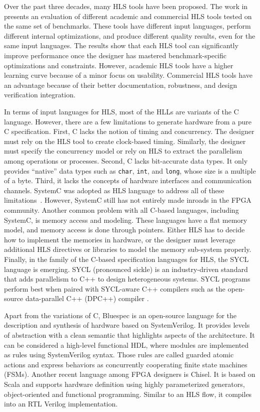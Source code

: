 Over the past three decades, many HLS tools have been proposed. The work in \cite{survey_evaluation} presents an evaluation of different academic and commercial HLS tools tested on the same set of benchmarks. These tools have different input languages, perform different internal optimizations, and produce different quality results, even for the same input languages. The results show that each HLS tool can significantly improve performance once the designer has mastered benchmark-specific optimizations and constraints. However, academic HLS tools have a higher learning curve because of a minor focus on usability. Commercial HLS tools have an advantage because of their better documentation, robustness, and design verification integration.

In terms of input languages for HLS, most of the HLLs are variants of the C language. However, there are a few limitations to generate hardware from a pure C specification. First, C lacks the notion of timing and concurrency. The designer must rely on the HLS tool to create clock-based timing. Similarly, the designer must specify the concurrency model or rely on HLS to extract the parallelism among operations or processes. Second, C lacks bit-accurate data types. It only provides ``native'' data types such as \texttt{char}, \texttt{int}, and \texttt{long}, whose size is a multiple of a byte. Third, it lacks the concepts of hardware interfaces and communication channels. SystemC was adopted as HLS language to address all of these limitations~\cite{6838614}. However, SystemC still has not entirely made inroads in the FPGA community. Another common problem with all C-based languages, including SystemC, is memory access and modeling. These languages have a flat memory model, and memory access is done through pointers. Either HLS has to decide how to implement the memories in hardware, or the designer must leverage additional HLS directives or libraries to model the memory sub-system properly. Finally, in the family of the C-based specification languages for HLS, the SYCL language is emerging. SYCL (pronounced sickle) is an industry-driven standard that adds parallelism to C++ to design heterogeneous systems. SYCL programs perform best when paired with SYCL-aware C++ compilers such as the open-source data-parallel C++ (DPC++) compiler \cite{dpcplus}.

Apart from the variations of C, Bluespec is an open-source language for the description and synthesis of hardware based on SystemVerilog. It provides levels of abstraction with a clean semantic that highlights aspects of the architecture. It can be considered a high-level functional HDL, where modules are implemented as rules using SystemVerilog syntax. Those rules are called guarded atomic actions and express behaviors as concurrently cooperating finite state machines (FSMs). Another recent language among FPGA designers is Chisel. It is based on Scala and supports hardware definition using highly parameterized generators, object-oriented and functional programming. Similar to an HLS flow, it compiles into an RTL Verilog implementation. 



